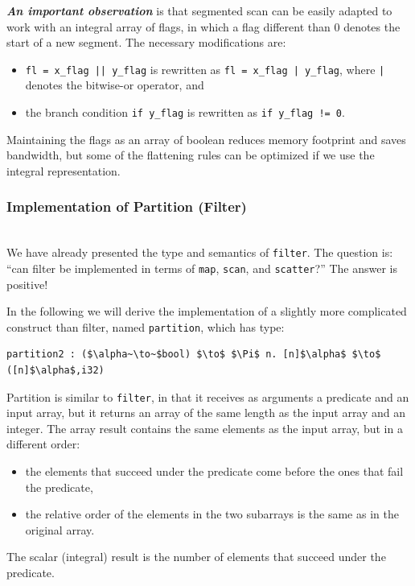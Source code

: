 \documentclass[acmsmall,review]{acmart}\settopmatter{printfolios=true,printccs=false,printacmref=false}
\begin{document}
\textbf{\em An important observation} is that segmented scan can be easily 
adapted to work with an integral array of flags, in which a flag different 
than $0$ denotes the start of a new segment. The necessary modifications are:
\begin{itemize}
    \item {\tt fl = x\_flag || y\_flag} is rewritten as {\tt fl = x\_flag | y\_flag},
            where {\tt |} denotes the bitwise-or operator, and
    \item the branch condition {\tt if y\_flag} is rewritten as
            {\tt if y\_flag != 0}.
\end{itemize}
Maintaining the flags as an array of boolean reduces memory footprint and
saves bandwidth, but some of the flattening rules can be optimized if we
use the integral representation.

\subsubsection{Implementation of Partition (Filter)}
\label{subsubsub:filter-impl}
$\mbox{ }$\\

We have already presented the type and semantics of \lstinline{filter}.
The question is: ``can filter be implemented in terms of \lstinline{map},
\lstinline{scan}, and \lstinline{scatter}?''
The answer is positive! 

In the following we will derive the implementation of a slightly more complicated 
construct than filter, named \lstinline{partition}, which has type:
\begin{lstlisting}[mathescape=true]
partition2 : ($\alpha~\to~$bool) $\to$ $\Pi$ n. [n]$\alpha$ $\to$ ([n]$\alpha$,i32) 
\end{lstlisting}\vspace{-2ex}
Partition is similar to \lstinline{filter}, in that it receives
as arguments a predicate and an input array, but it returns
an array of the same length as the input array and an integer.
The array result contains the same elements as the input array,
but in a different order: 
\begin{itemize}
    \item the elements that succeed under the predicate
            come before the ones that fail the predicate,
    \item the relative order of the elements in the two
            subarrays is the same as in the original array.
\end{itemize}
The scalar (integral) result is the number of elements that succeed 
under the predicate. 
\end{document}
